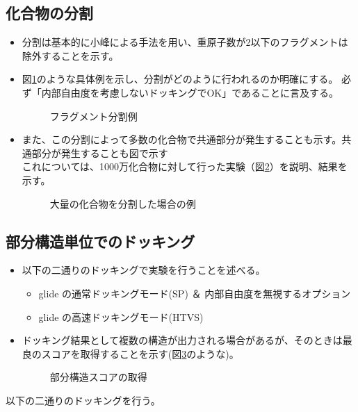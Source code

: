 \subsection{化合物の分割}
\begin{itemize}
\item 分割は基本的に小峰による手法を用い\cite{}、重原子数が2以下のフラグメントは除外することを示す。
\item 図\ref{fig:ex_decomposition}のような具体例を示し、分割がどのように行われるのか明確にする。
	必ず「内部自由度を考慮しないドッキングでOK」であることに言及する。
	\begin{figure}[htp]
	 \begin{center}
	  \caption{フラグメント分割例}
	  \label{fig:ex_decomposition}
	 \end{center}
	\end{figure}
\item また、この分割によって多数の化合物で共通部分が発生することも示す。共通部分が発生することも図で示す\\
	これについては、1000万化合物に対して行った実験（図\ref{fig:decomposition_amount}）を説明、結果を示す。
	\begin{figure}[htp]
	 \begin{center}
	  \caption{大量の化合物を分割した場合の例}
	  \label{fig:decomposition_amount}
	 \end{center}
	\end{figure}

\end{itemize}

\subsection{部分構造単位でのドッキング}
\begin{itemize}
\item 以下の二通りのドッキングで実験を行うことを述べる。
	\begin{itemize}
	\item glide の通常ドッキングモード(SP) ＆ 内部自由度を無視するオプション
	\item glide の高速ドッキングモード(HTVS)
	\end{itemize}
\item ドッキング結果として複数の構造が出力される場合があるが、そのときは最良のスコアを取得することを示す(図\ref{fig:fragment_result}のような)。
	\begin{figure}[htp]
	 \begin{center}
	  \caption{部分構造スコアの取得}
	  \label{fig:fragment_result}
	 \end{center}
	\end{figure}
\end{itemize}
以下の二通りのドッキングを行う。

